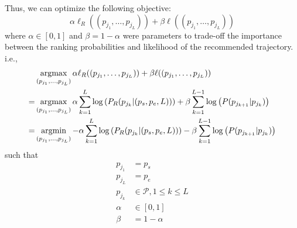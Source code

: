 

Thus, we can optimize the following objective:
\begin{displaymath}
    \alpha \ell_R((p_{j_1}, \dots, p_{j_L})) + \beta \ell((p_{j_1}, \dots, p_{j_L}))
\end{displaymath}
where $\alpha \in [0, 1]$ and $\beta = 1 - \alpha$ were parameters to trade-off the importance between the ranking probabilities 
and likelihood of the recommended trajectory.
i.e.,
\begin{align*}
    & \operatorname*{argmax}_{(p_{j_1}, \dots, p_{j_L})} \alpha \ell_R((p_{j_1}, \dots, p_{j_L})) + \beta \ell((p_{j_1}, \dots, p_{j_L})) \\
   =& \operatorname*{argmax}_{(p_{j_1}, \dots, p_{j_L})} \alpha \sum_{k=1}^L \log \left( P_R(p_{j_k} |(p_s, p_e, L)) \right) + 
      \beta \sum_{k=1}^{L-1} \log \left( P(p_{j_{k+1}} | p_{j_k}) \right) \\
   =& \operatorname*{argmin}_{(p_{j_1}, \dots, p_{j_L})} - \alpha \sum_{k=1}^L \log \left( P_R(p_{j_k} |(p_s, p_e, L)) \right) -
      \beta \sum_{k=1}^{L-1} \log \left( P(p_{j_{k+1}} | p_{j_k}) \right) 
\end{align*}
such that
\begin{align*}
    p_{j_1} &= p_s \\
    p_{j_L} &= p_e \\
    p_{j_k} &\in \mathcal{P}, 1 \le k \le L \\
    \alpha  &\in [0, 1] \\
    \beta   &= 1 - \alpha
\end{align*}

